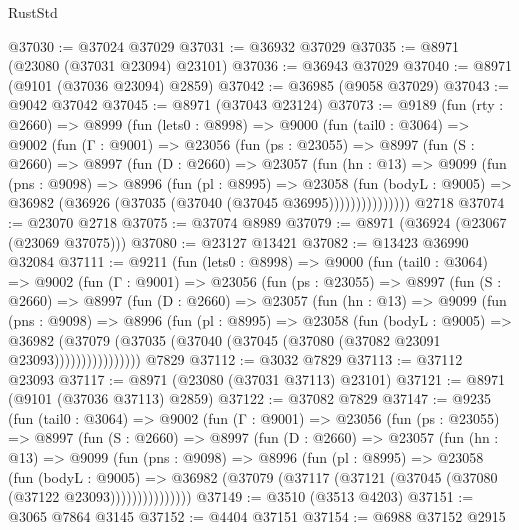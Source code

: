 \begin{lexlean}{RustStd}
\begin{coremodule}
@37030 := @37024 @37029
@37031 := @36932 @37029
@37035 := @8971 (@23080 (@37031 @23094) @23101)
@37036 := @36943 @37029
@37040 := @8971 (@9101 (@37036 @23094) @2859)
@37042 := @36985 (@9058 @37029)
@37043 := @9042 @37042
@37045 := @8971 (@37043 @23124)
@37073 := @9189
    (fun (rty : @2660) =>
    @8999
      (fun (lets0 : @8998) =>
      @9000
        (fun (tail0 : @3064) =>
        @9002
          (fun (Γ : @9001) =>
          @23056
            (fun (ps : @23055) =>
            @8997
              (fun (S : @2660) =>
              @8997
                (fun (D : @2660) =>
                @23057
                  (fun (hn : @13) =>
                  @9099
                    (fun (pns : @9098) =>
                    @8996
                      (fun (pl : @8995) =>
                      @23058
                        (fun (bodyL : @9005) =>
                        @36982 (@36926 (@37035 (@37040 (@37045 @36995)))))))))))))))
    @2718
@37074 := @23070 @2718
@37075 := @37074 @8989
@37079 := @8971 (@36924 (@23067 (@23069 @37075)))
@37080 := @23127 @13421
@37082 := @13423 @36990 @32084
@37111 := @9211
    (fun (lets0 : @8998) =>
    @9000
      (fun (tail0 : @3064) =>
      @9002
        (fun (Γ : @9001) =>
        @23056
          (fun (ps : @23055) =>
          @8997
            (fun (S : @2660) =>
            @8997
              (fun (D : @2660) =>
              @23057
                (fun (hn : @13) =>
                @9099
                  (fun (pns : @9098) =>
                  @8996
                    (fun (pl : @8995) =>
                    @23058
                      (fun (bodyL : @9005) =>
                      @36982
                        (@37079
                          (@37035 (@37040 (@37045 (@37080 (@37082 @23091 @23093))))))))))))))))
    @7829
@37112 := @3032 @7829
@37113 := @37112 @23093
@37117 := @8971 (@23080 (@37031 @37113) @23101)
@37121 := @8971 (@9101 (@37036 @37113) @2859)
@37122 := @37082 @7829
@37147 := @9235
    (fun (tail0 : @3064) =>
    @9002
      (fun (Γ : @9001) =>
      @23056
        (fun (ps : @23055) =>
        @8997
          (fun (S : @2660) =>
          @8997
            (fun (D : @2660) =>
            @23057
              (fun (hn : @13) =>
              @9099
                (fun (pns : @9098) =>
                @8996
                  (fun (pl : @8995) =>
                  @23058
                    (fun (bodyL : @9005) =>
                    @36982 (@37079 (@37117 (@37121 (@37045 (@37080 (@37122 @23093)))))))))))))))
@37149 := @3510 (@3513 @4203)
@37151 := @3065 @7864 @3145
@37152 := @4404 @37151
@37154 := @6988 @37152 @2915

\end{coremodule}
\end{lexlean}
